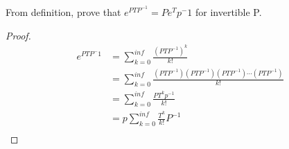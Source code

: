 \begin{example}
  From definition, prove that $e^{PTP^{-1}}=P e^T p^-1$ for invertible P.
  
  
  \begin{proof}
  \begin{align*}
  e^{PTP^-1} &= \sum_{k=0}^{inf} \frac{{(P T P^{-1})}^k}{k!} \\
             &= \sum_{k=0}^{inf} \frac{(P T P^{-1})(P T P^{-1})(P T P^{-1}) \cdots (P T P^{-1})}{k!} \\
             &= \sum_{k=0}^{inf} \frac{P T^k p^{-1}}{k!} \\
             &= p \sum_{k=0}^{inf} \frac{T^k}{k!} P^{-1} \\
     \end{align*}
  \end{proof}
\end{example}
